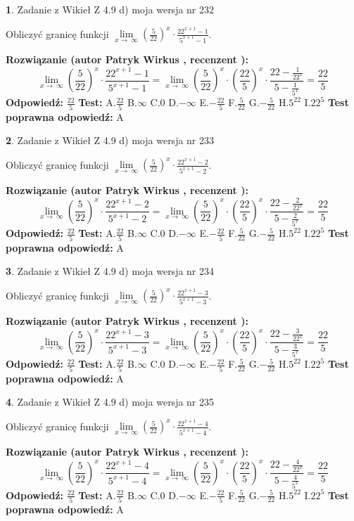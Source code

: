 \documentclass[12pt, a4paper]{article}
\theoremstyle{definition} %
\newtheorem{zad}{}
\newcommand{\zadStart}[1]{\begin{zad}#1\newline}
\newcommand{\zadStop}{\end{zad}}
\newcommand{\rozwStart}[2]{\noindent \textbf{Rozwiązanie (autor #1 , recenzent #2): }\newline}
\newcommand{\rozwStop}{\newline}
\newcommand{\odpStart}{\noindent \textbf{Odpowiedź:}\newline}
\newcommand{\odpStop}{\newline}
\newcommand{\testStart}{\noindent \textbf{Test:}\newline}
\newcommand{\testStop}{\newline}
\newcommand{\kluczStart}{\noindent \textbf{Test poprawna odpowiedź:}\newline}
\newcommand{\kluczStop}{\newline}
\begin{document}
\zadStart{Zadanie z Wikieł Z 4.9 d) moja wersja nr 232}


Obliczyć granicę funkcji  $\lim\limits_{x\to\ \infty}(\frac{5}{22})^{x}\cdot\frac{22^{x+1}-1}{5^{x+1}-1}$.
\zadStop
\rozwStart{Patryk Wirkus}{}
$$\lim\limits_{x\to\ \infty}(\frac{5}{22})^{x}\cdot\frac{22^{x+1}-1}{5^{x+1}-1}=\lim\limits_{x\to\ \infty}(\frac{5}{22})^{x}\cdot(\frac{22}{5})^{x} \cdot \frac{22-\frac{1}{22^{x}}}{5-\frac{1}{5^{x}}} = \frac{22}{5}$$
\rozwStop
\odpStart
$\frac{22}{5}$
\odpStop
\testStart
A.$\frac{22}{5}$ B.$\infty$ C.$0$ D.$-\infty$ E.$-\frac{22}{5}$
F.$\frac{5}{22}$ G.$-\frac{5}{22}$
H.$5^{22}$
I.$22^{5}$
\testStop
\kluczStart
A
\kluczStop



\zadStart{Zadanie z Wikieł Z 4.9 d) moja wersja nr 233}


Obliczyć granicę funkcji  $\lim\limits_{x\to\ \infty}(\frac{5}{22})^{x}\cdot\frac{22^{x+1}-2}{5^{x+1}-2}$.
\zadStop
\rozwStart{Patryk Wirkus}{}
$$\lim\limits_{x\to\ \infty}(\frac{5}{22})^{x}\cdot\frac{22^{x+1}-2}{5^{x+1}-2}=\lim\limits_{x\to\ \infty}(\frac{5}{22})^{x}\cdot(\frac{22}{5})^{x} \cdot \frac{22-\frac{2}{22^{x}}}{5-\frac{2}{5^{x}}} = \frac{22}{5}$$
\rozwStop
\odpStart
$\frac{22}{5}$
\odpStop
\testStart
A.$\frac{22}{5}$ B.$\infty$ C.$0$ D.$-\infty$ E.$-\frac{22}{5}$
F.$\frac{5}{22}$ G.$-\frac{5}{22}$
H.$5^{22}$
I.$22^{5}$
\testStop
\kluczStart
A
\kluczStop



\zadStart{Zadanie z Wikieł Z 4.9 d) moja wersja nr 234}


Obliczyć granicę funkcji  $\lim\limits_{x\to\ \infty}(\frac{5}{22})^{x}\cdot\frac{22^{x+1}-3}{5^{x+1}-3}$.
\zadStop
\rozwStart{Patryk Wirkus}{}
$$\lim\limits_{x\to\ \infty}(\frac{5}{22})^{x}\cdot\frac{22^{x+1}-3}{5^{x+1}-3}=\lim\limits_{x\to\ \infty}(\frac{5}{22})^{x}\cdot(\frac{22}{5})^{x} \cdot \frac{22-\frac{3}{22^{x}}}{5-\frac{3}{5^{x}}} = \frac{22}{5}$$
\rozwStop
\odpStart
$\frac{22}{5}$
\odpStop
\testStart
A.$\frac{22}{5}$ B.$\infty$ C.$0$ D.$-\infty$ E.$-\frac{22}{5}$
F.$\frac{5}{22}$ G.$-\frac{5}{22}$
H.$5^{22}$
I.$22^{5}$
\testStop
\kluczStart
A
\kluczStop



\zadStart{Zadanie z Wikieł Z 4.9 d) moja wersja nr 235}


Obliczyć granicę funkcji  $\lim\limits_{x\to\ \infty}(\frac{5}{22})^{x}\cdot\frac{22^{x+1}-4}{5^{x+1}-4}$.
\zadStop
\rozwStart{Patryk Wirkus}{}
$$\lim\limits_{x\to\ \infty}(\frac{5}{22})^{x}\cdot\frac{22^{x+1}-4}{5^{x+1}-4}=\lim\limits_{x\to\ \infty}(\frac{5}{22})^{x}\cdot(\frac{22}{5})^{x} \cdot \frac{22-\frac{4}{22^{x}}}{5-\frac{4}{5^{x}}} = \frac{22}{5}$$
\rozwStop
\odpStart
$\frac{22}{5}$
\odpStop
\testStart
A.$\frac{22}{5}$ B.$\infty$ C.$0$ D.$-\infty$ E.$-\frac{22}{5}$
F.$\frac{5}{22}$ G.$-\frac{5}{22}$
H.$5^{22}$
I.$22^{5}$
\testStop
\kluczStart
A
\kluczStop
\end{document}
